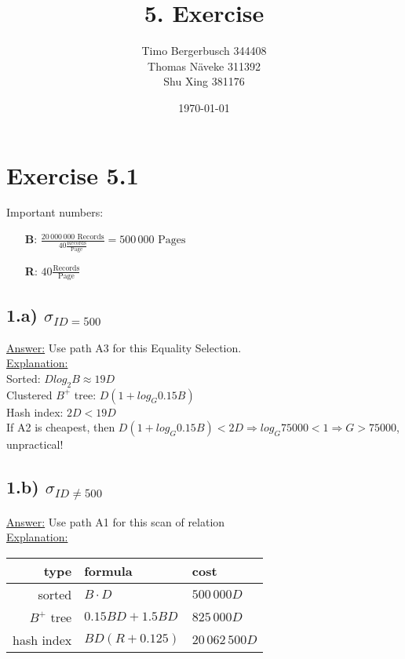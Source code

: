 \documentclass[12pt]{article}
\begin{document}
	
	\title{5. Exercise}
	\author{Timo Bergerbusch 344408 \\ Thomas Näveke 311392 \\ Shu Xing 381176}
	\date{\specialdate\today}
	\maketitle
	
	\section*{Exercise 5.1}
	Important numbers:\\
	\begin{itemize}
		\item[\textbf{B}:] $\frac{20\,000\,000 \text{ Records}}{40 \frac{\text{Records}}{\text{Page}}}= 500\,000 \text{ Pages}$
		\item[\textbf{R}:] $40 \frac{\text{Records}}{\text{Page}}$
	\end{itemize}
	\subsection*{1.a) $\sigma_{ID=500}$}
		\underline{Answer:} Use path A3 for this Equality Selection. \\
		\underline{Explanation:} \\%
         Sorted: $Dlog_2{B}\approx 19D$ \\
		Clustered $B^+$ tree: $D(1+log_{G}{0.15B})$ \\
		Hash index: $2D<19D$\\
		If A2 is cheapest, then $D(1+log_{G}{0.15B})<2D\Rightarrow log_{G}{75000}<1\Rightarrow G>75000$, unpractical!
		
	\subsection*{1.b) $\sigma_{ID\neq 500}$}
		\underline{Answer:} Use path A1 for this scan of relation\\
		\underline{Explanation:} \\
			\begin{tabular} {r | l |l}
				type & formula & cost \\ \hline
				sorted & $B\cdot D$ & $500\,000D$ \\
				$B^+$ tree & $0.15BD+1.5BD$ & $825\,000D$ \\
				hash index & $BD(R+0.125)$ & $20\,062\,500D$
			\end{tabular}
\end{document}
